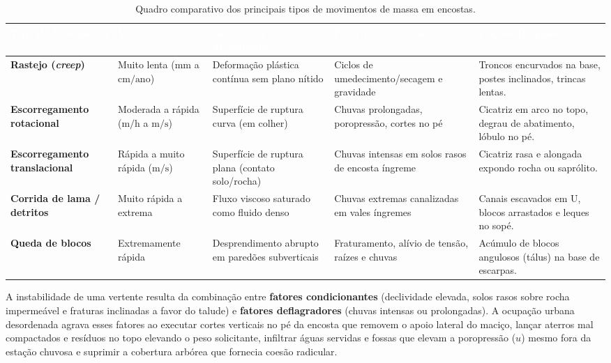 \begin{table}[H]
\centering
\caption{Quadro comparativo dos principais tipos de movimentos de massa em encostas.}
\label{tab:movimentos_massa}
\renewcommand{\arraystretch}{1.20}
\small
\begin{tabularx}{\textwidth}{@{}p{2.5cm} p{2.0cm} p{2.6cm} p{3.1cm} >{\raggedright\arraybackslash}X@{}}
  \toprule
  \rowcolor{uefsNavy}
  \textcolor{white}{\bfseries Tipo de Movimento} & \textcolor{white}{\bfseries Velocidade} & \textcolor{white}{\bfseries Geometria / Mecanismo} & \textcolor{white}{\bfseries Principais Gatilhos} & \textcolor{white}{\bfseries Feições Diagnósticas} \\
  \midrule
  \textbf{Rastejo (\textit{creep})} & Muito lenta ($\text{mm}$ a $\text{cm}/\text{ano}$) & Deformação plástica contínua sem plano nítido & Ciclos de umedecimento/secagem e gravidade & Troncos encurvados na base, postes inclinados, trincas lentas. \\
  \rowcolor{bgGray}
  \textbf{Escorregamento rotacional} & Moderada a rápida ($\text{m/h}$ a $\text{m/s}$) & Superfície de ruptura curva (em colher) & Chuvas prolongadas, poropressão, cortes no pé & Cicatriz em arco no topo, degrau de abatimento, lóbulo no pé. \\
  \textbf{Escorregamento translacional} & Rápida a muito rápida ($\text{m/s}$) & Superfície de ruptura plana (contato solo/rocha) & Chuvas intensas em solos rasos de encosta íngreme & Cicatriz rasa e alongada expondo rocha ou saprólito. \\
  \rowcolor{bgGray}
  \textbf{Corrida de lama / detritos} & Muito rápida a extrema & Fluxo viscoso saturado como fluido denso & Chuvas extremas canalizadas em vales íngremes & Canais escavados em U, blocos arrastados e leques no sopé. \\
  \textbf{Queda de blocos} & Extremamente rápida & Desprendimento abrupto em paredões subverticais & Fraturamento, alívio de tensão, raízes e chuvas & Acúmulo de blocos angulosos (tálus) na base de escarpas. \\
  \bottomrule
\end{tabularx}
\end{table}

A instabilidade de uma vertente resulta da combinação entre \textbf{fatores condicionantes} (declividade elevada, solos rasos sobre rocha impermeável e fraturas inclinadas a favor do talude) e \textbf{fatores deflagradores} (chuvas intensas ou prolongadas). A ocupação urbana desordenada agrava esses fatores ao executar cortes verticais no pé da encosta que removem o apoio lateral do maciço, lançar aterros mal compactados e resíduos no topo elevando o peso solicitante, infiltrar águas servidas e fossas que elevam a poropressão ($u$) mesmo fora da estação chuvosa e suprimir a cobertura arbórea que fornecia coesão radicular.

